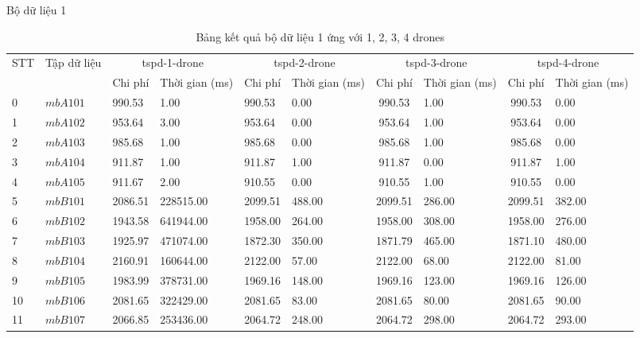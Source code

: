 \documentclass[compress]{beamer}
\begin{document}
\begin{frame}{Bộ dữ liệu 1}
\tiny
\begin{longtable}{|p{0.2cm}|p{1.0cm}|p{0.55cm}|p{0.85cm}|p{0.6cm}|p{0.7cm}|c|p{0.85cm}|c|p{0.85cm}|}
\caption{Bảng kết quả bộ dữ liệu 1 ứng với 1, 2, 3, 4 drones}
\label{tabletspkd1}\\ 
\toprule
STT&\multirow{2}{*}{Tập dữ liệu} & \multicolumn{2}{c|}{tspd-1-drone } &\multicolumn{2}{c|}{tspd-2-drone } &\multicolumn{2}{c|}{tspd-3-drone }&\multicolumn{2}{c|}{tspd-4-drone } \\
\cline{3-10} 
&&Chi phí &Thời gian (ms)&Chi phí &Thời gian (ms)&Chi phí &Thời gian (ms)&Chi phí &Thời gian (ms)\\
\midrule
        \toprule
0&$mbA101$ &     990.53 &      1.00 &     990.53 &       0.00 &     990.53 &       1.00 &     990.53 &       0.00\\ \hline 
1&$mbA102$ &     953.64 &      3.00 &     953.64 &       0.00 &     953.64 &       1.00 &     953.64 &       0.00\\ \hline 
2&$mbA103$ &     985.68 &      1.00 &     985.68 &       0.00 &     985.68 &       1.00 &     985.68 &       0.00\\ \hline 
3&$mbA104$ &     911.87 &      1.00 &     911.87 &       1.00 &     911.87 &       0.00 &     911.87 &       1.00\\ \hline 
4&$mbA105$ &     911.67 &      2.00 &     910.55 &       0.00 &     910.55 &       1.00 &     910.55 &       0.00\\ \hline 
5&$mbB101$ &    2086.51 & 228515.00 &    2099.51 &     488.00 &    2099.51 &     286.00 &    2099.51 &     382.00\\ \hline 
6&$mbB102$ &    1943.58 & 641944.00 &    1958.00 &     264.00 &    1958.00 &     308.00 &    1958.00 &     276.00\\ \hline 
7&$mbB103$ &    1925.97 & 471074.00 &    1872.30 &     350.00 &    1871.79 &     465.00 &    1871.10 &     480.00\\ \hline 
8&$mbB104$ &    2160.91 & 160644.00 &    2122.00 &      57.00 &    2122.00 &      68.00 &    2122.00 &      81.00\\ \hline 
9&$mbB105$ &    1983.99 & 378731.00 &    1969.16 &     148.00 &    1969.16 &     123.00 &    1969.16 &     126.00\\ \hline 
10&$mbB106$ &    2081.65 & 322429.00 &    2081.65 &      83.00 &    2081.65 &      80.00 &    2081.65 &      90.00\\ \hline 
11&$mbB107$ &    2066.85 & 253436.00 &    2064.72 &     248.00 &    2064.72 &     298.00 &    2064.72 &     293.00\\ \hline 

\end{longtable}
\end{frame}
\end{document}
